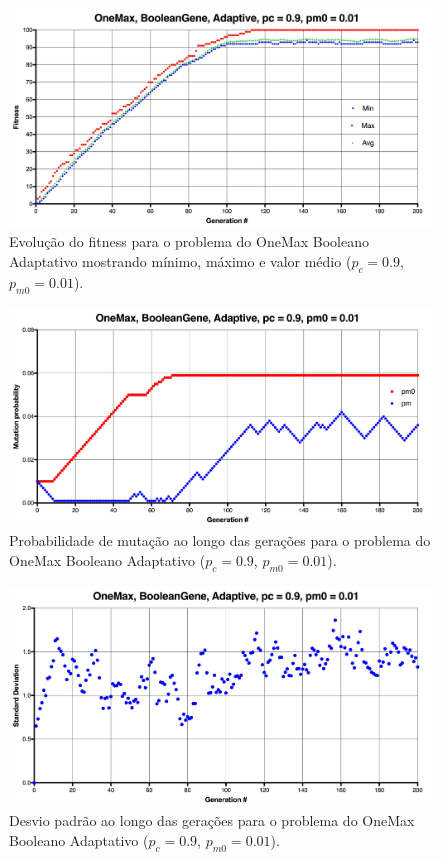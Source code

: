 \begin{figure}[ht!]
    \centering \includegraphics[width=1.0\textwidth]{onemax_boolean_adaptive.jpg}
    \caption{Evolução do fitness para o problema do OneMax Booleano Adaptativo mostrando mínimo, máximo e valor médio ($p_c=0.9$, $p_{m0}=0.01$).}
    \label{fig:onemax_boolean_adaptive}
\end{figure}

\begin{figure}[ht!]
    \centering \includegraphics[width=1.0\textwidth]{onemax_boolean_adaptive_pm.jpg}
    \caption{Probabilidade de mutação ao longo das gerações para o problema do OneMax Booleano Adaptativo ($p_c=0.9$, $p_{m0}=0.01$).}
    \label{fig:onemax_boolean_adaptive_pm}
\end{figure}

\begin{figure}[ht!]
    \centering \includegraphics[width=1.0\textwidth]{onemax_boolean_adaptive_std.jpg}
    \caption{Desvio padrão ao longo das gerações para o problema do OneMax Booleano Adaptativo ($p_c=0.9$, $p_{m0}=0.01$).}
    \label{fig:onemax_boolean_adaptive_std}
\end{figure}

